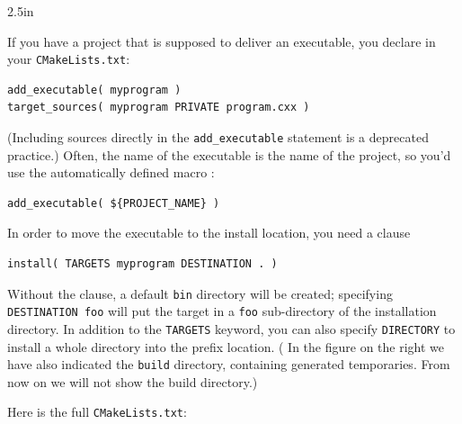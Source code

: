 \newcommand\fakefloat[1]{
  \begin{floatingfigure}[r]{2.5in}
    \hbox{}\vfil #1\hbox{}
  \end{floatingfigure}
}
\begin{floatingfigure}[r]{2.5in}
  \begin{minipage}{2.5in}
  \end{minipage}
\end{floatingfigure}
%
If you have a project that is supposed to deliver an executable,
you declare in your \lstinline[language=shell]{CMakeLists.txt}:
\begin{lstlisting}
add_executable( myprogram )
target_sources( myprogram PRIVATE program.cxx )
\end{lstlisting}
(Including sources directly in the \lstinline{add_executable}
statement is a deprecated practice.)
Often, the name of the executable is the name of the project,
so you'd use the automatically defined macro :
\begin{lstlisting}
add_executable( ${PROJECT_NAME} )
\end{lstlisting}
% 
In order to move the executable to the install location,
you need a clause
\begin{lstlisting}
install( TARGETS myprogram DESTINATION . )
\end{lstlisting}
Without the  clause, a default \lstinline[language=shell]{bin} directory
will be created; specifying \lstinline{DESTINATION foo} will put the
target in a \lstinline[language=shell]{foo} sub-directory of the installation directory.
In addition to the \lstinline{TARGETS} keyword, you can also specify
\lstinline{DIRECTORY} to install a whole directory into the prefix location.
( In the figure on the right we have also indicated the
\lstinline[language=shell]{build} directory,
containing generated temporaries.
From now on we will not show the build directory.)

Here is the full \lstinline[language=shell]{CMakeLists.txt}:
%


